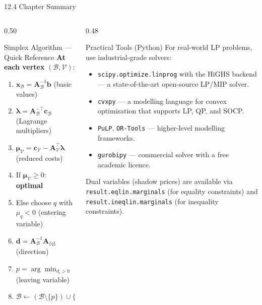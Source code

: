 \documentclass[aspectratio=169,10pt]{beamer}
\newcommand{\xv}{\mathbf{x}}
\newcommand{\cv}{\mathbf{c}}
\newcommand{\bv}{\mathbf{b}}
\newcommand{\Av}{\mathbf{A}}
\newcommand{\muv}{\boldsymbol{\mu}}
\newcommand{\lav}{\boldsymbol{\lambda}}
\newcommand{\calB}{\mathcal{B}}
\newcommand{\calV}{\mathcal{V}}
\begin{document}
\begin{frame}[allowframebreaks]{12.4 Chapter Summary}
\begin{columns}
  \begin{column}{0.50\textwidth}
    \begin{block}{Simplex Algorithm --- Quick Reference}
      \textbf{At each vertex} $(\calB, \calV)$:
      \begin{enumerate}
        \item $\xv_\calB = \Av_\calB^{-1}\bv$ (basic values)
        \item $\lav = \Av_\calB^{-\top}\cv_\calB$ (Lagrange multipliers)
        \item $\muv_\calV = \cv_\calV - \Av_\calV^\top\lav$ (reduced costs)
        \item If $\muv_\calV \ge 0$: \textbf{optimal}
        \item Else choose $q$ with $\mu_q < 0$ (entering variable)
        \item $\mathbf{d} = \Av_\calB^{-1}\Av_{\{q\}}$ (direction)
        \item $p = \arg\min_{d_i>0}\,(\xv_\calB)_i/d_i$ (leaving variable)
        \item $\calB \leftarrow (\calB\setminus\{p\})\cup\{q\}$
      \end{enumerate}
    \end{block}
  \end{column}
  \begin{column}{0.48\textwidth}
    \begin{block}{Practical Tools (Python)}
      For real-world LP problems, use industrial-grade solvers:
      \begin{itemize}
        \item \texttt{scipy.optimize.linprog} with the HiGHS backend ---
              a state-of-the-art open-source LP/MIP solver.
        \item \texttt{cvxpy} --- a modelling language for convex optimisation
              that supports LP, QP, and SOCP.
        \item \texttt{PuLP}, \texttt{OR-Tools} --- higher-level
              modelling frameworks.
        \item \texttt{gurobipy} --- commercial solver with a free academic licence.
      \end{itemize}
      Dual variables (shadow prices) are available via
      \texttt{result.eqlin.marginals} (for equality constraints) and
      \texttt{result.ineqlin.marginals} (for inequality constraints).
    \end{block}
  \end{column}
\end{columns}

\end{frame}
\end{document}
